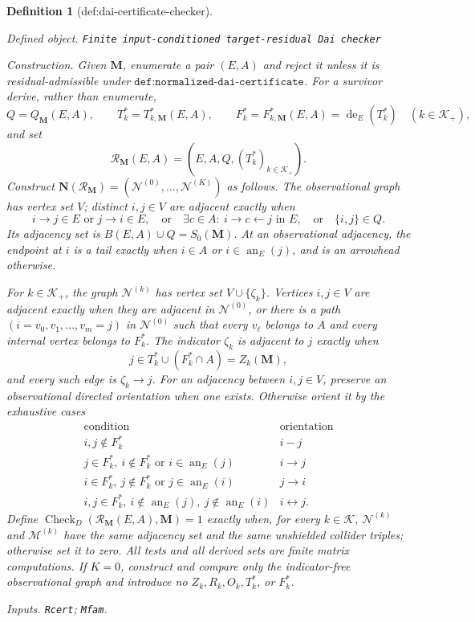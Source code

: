 \documentclass{article}
\newtheorem{definition}{Definition}
\begin{document}
\begin{definition}[def:dai-certificate-checker]\label{def:dai-certificate-checker}
\par\smallskip\noindent\emph{Defined object.} \texttt{Finite input-\allowbreak{}conditioned target-\allowbreak{}residual Dai checker}
\par\smallskip\noindent\emph{Construction.} Given \(\mathbf M\), enumerate a pair \((E,A)\) and reject it unless it is residual-admissible under \(\texttt{def:normalized-dai-certificate}\).  For a survivor derive, rather than enumerate,
\[
Q=Q_{\mathbf M}(E,A),
\qquad
T_k^*=T^*_{k,\mathbf M}(E,A),
\qquad
F_k^*=F^*_{k,\mathbf M}(E,A)=\operatorname{de}_E(T_k^*)
\quad(k\in\mathcal K_+),
\]
and set
\[
\mathcal R_{\mathbf M}(E,A)=
\left(E,A,Q,(T_k^*)_{k\in\mathcal K_+}\right).
\]
Construct \(\mathbf N(\mathcal R_{\mathbf M})=(\mathcal N^{(0)},\ldots,\mathcal N^{(K)})\) as follows.  The observational graph has vertex set \(V\); distinct \(i,j\in V\) are adjacent exactly when
\[
i\to j\in E\text{ or }j\to i\in E,
\quad\text{or}\quad
\exists c\in A:\ i\to c\leftarrow j\text{ in }E,
\quad\text{or}\quad
\{i,j\}\in Q.
\]
Its adjacency set is \(B(E,A)\cup Q=S_0(\mathbf M)\).  At an observational adjacency, the endpoint at \(i\) is a tail exactly when \(i\in A\) or \(i\in\operatorname{an}_E(j)\), and is an arrowhead otherwise.

For \(k\in\mathcal K_+\), the graph \(\mathcal N^{(k)}\) has vertex set \(V\cup\{\zeta_k\}\).  Vertices \(i,j\in V\) are adjacent exactly when they are adjacent in \(\mathcal N^{(0)}\), or there is a path \((i=v_0,v_1,\ldots,v_m=j)\) in \(\mathcal N^{(0)}\) such that every \(v_\ell\) belongs to \(A\) and every internal vertex belongs to \(F_k^*\).  The indicator \(\zeta_k\) is adjacent to \(j\) exactly when
\[
j\in T_k^*\cup(F_k^*\cap A)=Z_k(\mathbf M),
\]
and every such edge is \(\zeta_k\to j\).  For an adjacency between \(i,j\in V\), preserve an observational directed orientation when one exists.  Otherwise orient it by the exhaustive cases
\[
\begin{array}{c|c}
\text{condition}&\text{orientation}\\ \hline
i,j\notin F_k^*&i\mathbin{-}j\\
j\in F_k^*,\ i\notin F_k^*\text{ or }i\in\operatorname{an}_E(j)&i\to j\\
i\in F_k^*,\ j\notin F_k^*\text{ or }j\in\operatorname{an}_E(i)&j\to i\\
i,j\in F_k^*,\ i\notin\operatorname{an}_E(j),\ j\notin\operatorname{an}_E(i)&i\leftrightarrow j.
\end{array}
\]
Define \(\operatorname{Check}_{D}(\mathcal R_{\mathbf M}(E,A),\mathbf M)=1\) exactly when, for every \(k\in\mathcal K\), \(\mathcal N^{(k)}\) and \(\mathcal M^{(k)}\) have the same adjacency set and the same unshielded collider triples; otherwise set it to zero.  All tests and all derived sets are finite matrix computations.  If \(K=0\), construct and compare only the indicator-free observational graph and introduce no \(Z_k,R_k,O_k,T_k^*\), or \(F_k^*\).
\par\smallskip\noindent\emph{Inputs.} \texttt{Rcert}; \texttt{Mfam}.
\end{definition}
\end{document}
